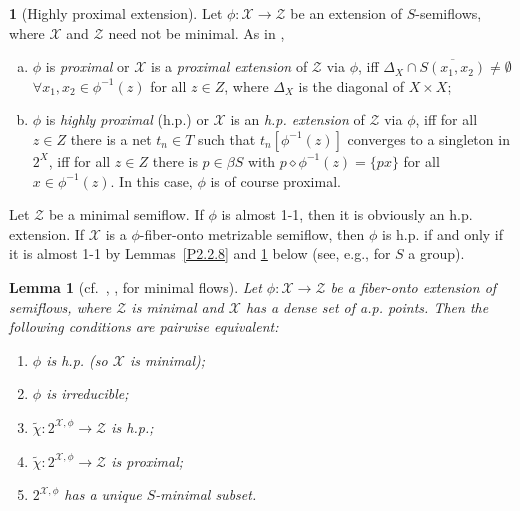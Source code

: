 \documentclass[12pt,final,3p,times]{elsarticle}
\newtheorem{slem}[sthm]{Lemma}
\theoremstyle{definition}
\newtheorem{sse}[sthm]{}
\numberwithin{equation}{section}
\begin{document}
\begin{sse}[Highly proximal extension]\label{P2.3.2}
Let $\phi\colon\mathscr{X}\rightarrow\mathscr{Z}$ be an extension of $S$-semiflows, where $\mathscr{X}$ and $\mathscr{Z}$ need not be minimal.
As in \cite{E73, S76, AG77, Wo, DeV}, 
\begin{enumerate}[a.]
\item[\textbf{a.}] $\phi$ is \textit{proximal} or $\mathscr{X}$ is a \textit{proximal extension} of $\mathscr{Z}$ via $\phi$, iff $\varDelta_X\cap \overline{S(x_1,x_2)}\not=\emptyset$ $\forall x_1,x_2\in\phi^{-1}(z)$ for all $z\in Z$, where $\varDelta_X$ is the diagonal of $X\times X$;

\item[\textbf{b.}] $\phi$ is \textit{highly proximal} (h.p.) or $\mathscr{X}$ is an \textit{h.p. extension} of $\mathscr{Z}$ via $\phi$, iff for all $z\in Z$ there is a net $t_n\in T$ such that $t_n[\phi^{-1}(z)]$ converges to a singleton in $2^X$, iff for all $z\in Z$ there is $p\in \beta S$ with $p\diamond\phi^{-1}(z)=\{px\}$ for all $x\in\phi^{-1}(z)$. In this case, $\phi$ is of course proximal.
\end{enumerate}
\end{sse}

Let $\mathscr{Z}$ be a minimal semiflow. If $\phi$ is almost 1-1, then it is obviously an h.p. extension. If $\mathscr{X}$ is a $\phi$-fiber-onto metrizable semiflow, then $\phi$ is h.p. if and only if it is almost 1-1 by Lemmas~\ref{P2.2.8} and \ref{P2.3.3} below (see, e.g., \cite[Rem.~IV.1.2]{Wo} for $S$ a group).

\begin{slem}[{cf.~\cite{AG77}, \cite[Thm.~IV.2.3]{Wo}, \cite[Prop.~VI.3.3]{DeV} for minimal flows}]\label{P2.3.3}
Let $\phi\colon\mathscr{X}\rightarrow\mathscr{Z}$ be a fiber-onto extension of semiflows, where $\mathscr{Z}$ is minimal and $\mathscr{X}$ has a dense set of a.p. points. Then the following conditions are pairwise equivalent:
\begin{enumerate}[(1)]
\item $\phi$ is h.p. (so $\mathscr{X}$ is minimal);
\item $\phi$ is irreducible;
\item $\tilde{\chi}\colon2^{\mathscr{X},\phi}\rightarrow\mathscr{Z}$ is h.p.;
\item $\tilde{\chi}\colon2^{\mathscr{X},\phi}\rightarrow\mathscr{Z}$ is proximal;
\item $2^{\mathscr{X},\phi}$ has a unique $S$-minimal subset.
\end{enumerate}
\end{slem}
\end{document}

